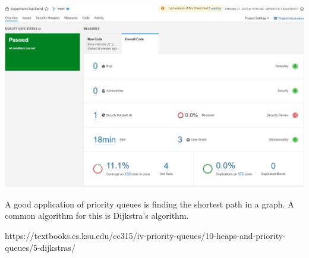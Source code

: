 \includegraphics[width=\textwidth]{./images/chapter3/sonarqube-report.png}

A good application of priority queues is finding the shortest path in a graph. A common algorithm for this is Dijkstra’s algorithm.

https://textbooks.cs.ksu.edu/cc315/iv-priority-queues/10-heaps-and-priority-queues/5-dijkstras/